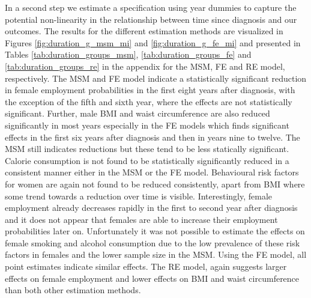 In a second step we estimate a specification using year dummies to capture the potential non-linearity in the relationship between time since diagnosis and our outcomes. The results for the different estimation methods are visualized in Figures \ref{fig:duration_g_msm_mi} and \ref{fig:duration_g_fe_mi} and presented in Tables \ref{tab:duration_groups_msm}, \ref{tab:duration_groups_fe} and \ref{tab:duration_groups_re} in the appendix for the \ac{MSM}, \ac{FE} and \ac{RE} model, respectively.  The \ac{MSM} and \ac{FE} model indicate a statistically significant reduction in female employment probabilities in the first eight years after diagnosis, with the exception of the fifth and sixth year, where the effects are not statistically significant. Further, male \ac{BMI} and waist circumference are also reduced significantly in most years especially in the \ac{FE} models which finds significant effects in the first six years after diagnosis and then in years nine to twelve. The \ac{MSM} still indicates reductions but these tend to be less statically significant. Calorie consumption is not found to be statistically significantly reduced in a consistent manner either in the \ac{MSM} or the \ac{FE} model. Behavioural risk factors for women are again not found to be reduced consistently, apart from \ac{BMI} where some trend towards a reduction over time is visible. Interestingly, female employment already decreases rapidly in the first to second year after diagnosis and it does not appear that females are able to increase their employment probabilities later on. Unfortunately it was not possible to estimate the effects on female smoking and alcohol consumption due to the low prevalence of these risk factors in females and the lower sample size in the \ac{MSM}. Using the \ac{FE} model, all point estimates indicate similar effects. The \ac{RE} model, again suggests larger effects on female employment and lower effects on \ac{BMI} and waist circumference than both other estimation methods. 

